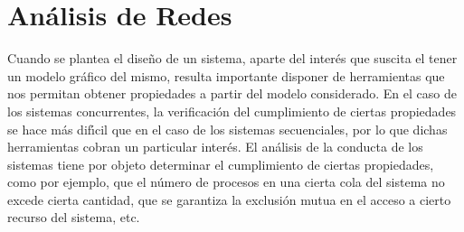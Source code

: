 %
%
%

%
%

\section{An\'{a}lisis de Redes}

Cuando se plantea el dise\~{n}o de un sistema, aparte del inter\'{e}s que
suscita el tener un modelo gr\'{a}fico del mismo, resulta importante
disponer de herramientas que nos permitan obtener propiedades
a partir del modelo considerado. En el caso de los sistemas
concurrentes, la verificaci\'{o}n del cumplimiento de ciertas
propiedades se hace m\'{a}s dif\'{\i}cil que en el caso de los sistemas
secuenciales, por lo que dichas herramientas cobran un particular
inter\'{e}s. El an\'{a}lisis de la conducta de los sistemas tiene por objeto
determinar el cumplimiento de ciertas propiedades, como por ejemplo,
que el n\'{u}mero de procesos en una cierta cola del sistema no excede
cierta cantidad, que se garantiza la exclusi\'{o}n mutua en el acceso
a cierto recurso del sistema, etc.

